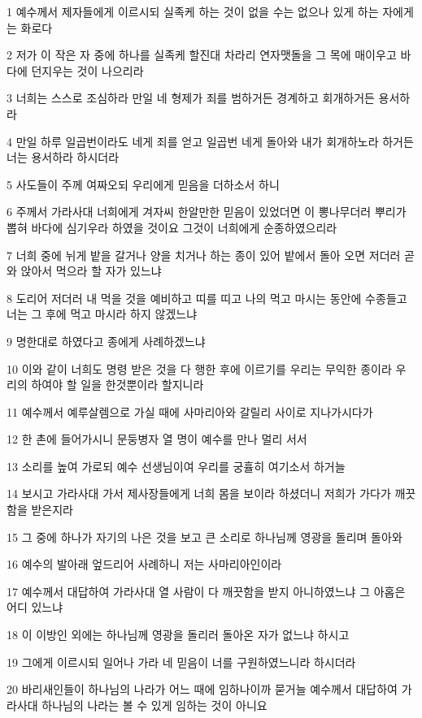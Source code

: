 \par 1 예수께서 제자들에게 이르시되 실족케 하는 것이 없을 수는 없으나 있게 하는 자에게는 화로다
\par 2 저가 이 작은 자 중에 하나를 실족케 할진대 차라리 연자맷돌을 그 목에 매이우고 바다에 던지우는 것이 나으리라
\par 3 너희는 스스로 조심하라 만일 네 형제가 죄를 범하거든 경계하고 회개하거든 용서하라
\par 4 만일 하루 일곱번이라도 네게 죄를 얻고 일곱번 네게 돌아와 내가 회개하노라 하거든 너는 용서하라 하시더라
\par 5 사도들이 주께 여짜오되 우리에게 믿음을 더하소서 하니
\par 6 주께서 가라사대 너희에게 겨자씨 한알만한 믿음이 있었더면 이 뽕나무더러 뿌리가 뽑혀 바다에 심기우라 하였을 것이요 그것이 너희에게 순종하였으리라
\par 7 너희 중에 뉘게 밭을 갈거나 양을 치거나 하는 종이 있어 밭에서 돌아 오면 저더러 곧 와 앉아서 먹으라 할 자가 있느냐
\par 8 도리어 저더러 내 먹을 것을 예비하고 띠를 띠고 나의 먹고 마시는 동안에 수종들고 너는 그 후에 먹고 마시라 하지 않겠느냐
\par 9 명한대로 하였다고 종에게 사례하겠느냐
\par 10 이와 같이 너희도 명령 받은 것을 다 행한 후에 이르기를 우리는 무익한 종이라 우리의 하여야 할 일을 한것뿐이라 할지니라
\par 11 예수께서 예루살렘으로 가실 때에 사마리아와 갈릴리 사이로 지나가시다가
\par 12 한 촌에 들어가시니 문둥병자 열 명이 예수를 만나 멀리 서서
\par 13 소리를 높여 가로되 예수 선생님이여 우리를 궁휼히 여기소서 하거늘
\par 14 보시고 가라사대 가서 제사장들에게 너희 몸을 보이라 하셨더니 저희가 가다가 깨끗함을 받은지라
\par 15 그 중에 하나가 자기의 나은 것을 보고 큰 소리로 하나님께 영광을 돌리며 돌아와
\par 16 예수의 발아래 엎드리어 사례하니 저는 사마리아인이라
\par 17 예수께서 대답하여 가라사대 열 사람이 다 깨끗함을 받지 아니하였느냐 그 아홉은 어디 있느냐
\par 18 이 이방인 외에는 하나님께 영광을 돌리러 돌아온 자가 없느냐 하시고
\par 19 그에게 이르시되 일어나 가라 네 믿음이 너를 구원하였느니라 하시더라
\par 20 바리새인들이 하나님의 나라가 어느 때에 임하나이까 묻거늘 예수께서 대답하여 가라사대 하나님의 나라는 볼 수 있게 임하는 것이 아니요
